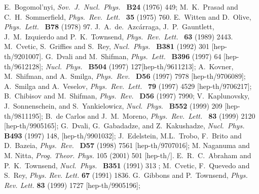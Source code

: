 \documentclass[a4paper,12pt]{article}
\begin{document}
\begin{thebibliography}{100}
 
   E.~Bogomol'nyi, 
             {\it Sov.\ J.\ Nucl.\ Phys.\ } {\bf B24} (1976) 449;
                M.~K.~Prasad and C.~H.~Sommerfield, 
             {\it Phys.\ Rev.\ Lett.\ } {\bf 35} (1975) 760.
%
 E.~Witten and D.~Olive, 
             {\it Phys.\ Lett.\ } {\bf B78} (1978) 97.
%
 J.~A.~de.~Azc\'{a}rraga, J.~P.~Gauntlett, J.~M.~Izquierdo 
                    and P.~K.~Townsend, 
             {\it Phys.\ Rev.\ Lett.\ } {\bf 63} (1989) 2443.
 M.~Cvetic, S.~Griffies and S.~Rey,
             {\it Nucl.\ Phys.\ } {\bf B381} (1992) 301 
             [hep-th/9201007].
%
G.~Dvali and M.~Shifman, 
             {\it Phys.\ Lett.\ } {\bf B396} (1997) 64 [hep-th/9612128]; 
             {\it Nucl.\ Phys.\ } {\bf B504} (1997) 127[hep-th/9611213]; 
             A.~Kovner, M.~Shifman, and A.~Smilga, 
            {\it Phys.\ Rev.\ } {\bf D56} (1997) 7978 
            [hep-th/9706089]; 
            A.~Smilga and A.~Veselov, 
            {\it Phys.\ Rev.\ Lett.\ } {\bf 79} (1997) 4529 
            [hep-th/9706217]; B.~Chibisov and M.~Shifman, 
            {\it Phys.\ Rev.\ } {\bf D56} (1997) 7990; 
             V.~Kaplunovsky, J.~Sonnenschein, and 
             S.~Yankielowicz, 
             {\it Nucl.\ Phys.\ } {\bf B552} (1999) 209 
             [hep-th/9811195];
             B.~de Carlos and J.~M.~Moreno,
            {\it Phys.\ Rev.\ Lett.\ } {\bf 83} (1999) 2120 
            [hep-th/9905165];
            G.~Dvali, G.~Gabadadze, and Z.~Kakushadze, 
            {\it Nucl.\ Phys.\ } {\bf B493} (1997) 148,
             [hep-th/9901032];
            J.~Edelstein, M.L.~Trobo, F.~Brito and D.~Bazeia, 
            {\it Phys.\ Rev.\ } {\bf D57} (1998) 7561 
            [hep-th/9707016];
            M. Naganuma and M. Nitta,
            {\em Prog. Theor. Phys.} {105} (2001) 501
            [hep-th/].
%
%
  E.~R.~C.~Abraham and P.~K.~Townsend, 
             {\it Nucl.\ Phys.\ } {\bf B351} (1991) 313 ;
             M.~Cvetic, F.~Quevedo and S.~Rey,
             {\em Phys. Rev. Lett.} {\bf 67} (1991) 1836.
  G.~Gibbons and P.~Townsend, 
              {\em Phys. Rev. Lett.} {\bf 83} 
              (1999) 1727 [hep-th/9905196]; 

\end{thebibliography}
\end{document}
